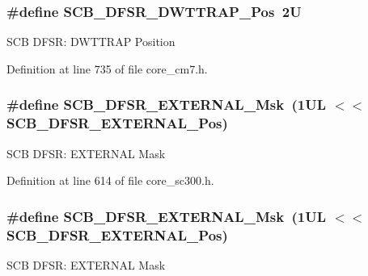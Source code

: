 \subsubsection[{\texorpdfstring{S\+C\+B\+\_\+\+D\+F\+S\+R\+\_\+\+D\+W\+T\+T\+R\+A\+P\+\_\+\+Pos}{SCB_DFSR_DWTTRAP_Pos}}]{\setlength{\rightskip}{0pt plus 5cm}\#define S\+C\+B\+\_\+\+D\+F\+S\+R\+\_\+\+D\+W\+T\+T\+R\+A\+P\+\_\+\+Pos~2U}\hypertarget{group___c_m_s_i_s___s_c_b_gaccf82364c6d0ed7206f1084277b7cc61}{}\label{group___c_m_s_i_s___s_c_b_gaccf82364c6d0ed7206f1084277b7cc61}
S\+CB D\+F\+SR\+: D\+W\+T\+T\+R\+AP Position 

Definition at line 735 of file core\+\_\+cm7.\+h.

\subsubsection[{\texorpdfstring{S\+C\+B\+\_\+\+D\+F\+S\+R\+\_\+\+E\+X\+T\+E\+R\+N\+A\+L\+\_\+\+Msk}{SCB_DFSR_EXTERNAL_Msk}}]{\setlength{\rightskip}{0pt plus 5cm}\#define S\+C\+B\+\_\+\+D\+F\+S\+R\+\_\+\+E\+X\+T\+E\+R\+N\+A\+L\+\_\+\+Msk~(1\+U\+L $<$$<$ S\+C\+B\+\_\+\+D\+F\+S\+R\+\_\+\+E\+X\+T\+E\+R\+N\+A\+L\+\_\+\+Pos)}\hypertarget{group___c_m_s_i_s___s_c_b_ga3cba2ec1f588ce0b10b191d6b0d23399}{}\label{group___c_m_s_i_s___s_c_b_ga3cba2ec1f588ce0b10b191d6b0d23399}
S\+CB D\+F\+SR\+: E\+X\+T\+E\+R\+N\+AL Mask 

Definition at line 614 of file core\+\_\+sc300.\+h.

\subsubsection[{\texorpdfstring{S\+C\+B\+\_\+\+D\+F\+S\+R\+\_\+\+E\+X\+T\+E\+R\+N\+A\+L\+\_\+\+Msk}{SCB_DFSR_EXTERNAL_Msk}}]{\setlength{\rightskip}{0pt plus 5cm}\#define S\+C\+B\+\_\+\+D\+F\+S\+R\+\_\+\+E\+X\+T\+E\+R\+N\+A\+L\+\_\+\+Msk~(1\+U\+L $<$$<$ S\+C\+B\+\_\+\+D\+F\+S\+R\+\_\+\+E\+X\+T\+E\+R\+N\+A\+L\+\_\+\+Pos)}\hypertarget{group___c_m_s_i_s___s_c_b_ga3cba2ec1f588ce0b10b191d6b0d23399}{}\label{group___c_m_s_i_s___s_c_b_ga3cba2ec1f588ce0b10b191d6b0d23399}
S\+CB D\+F\+SR\+: E\+X\+T\+E\+R\+N\+AL Mask 


